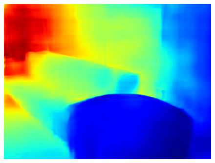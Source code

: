 \documentclass{svjour3}                     %
\begin{document}
\begin{figure}[t]
{\begin{minipage}[t]{0.15\linewidth}
  \includegraphics[width=1\linewidth]{images/nyu_without/living_room_rgb_01313.png}
  \end{minipage}%
  }
\end{figure}
\end{document}
